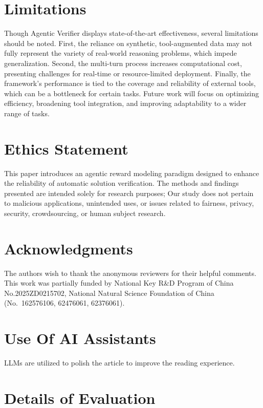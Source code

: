 \documentclass[11pt]{article}
\begin{document}
\section{Limitations}
Though Agentic Verifier displays state-of-the-art effectiveness, several limitations should be noted. First, the reliance on synthetic, tool-augmented data may not fully represent the variety of real-world reasoning problems, which impede generalization. Second, the multi-turn process increases computational cost, presenting challenges for real-time or resource-limited deployment. Finally, the framework’s performance is tied to the coverage and reliability of external tools, which can be a bottleneck for certain tasks. 
Future work will focus on optimizing efficiency, broadening tool integration, and improving adaptability to a wider range of tasks.

\section{Ethics Statement}
This paper introduces an agentic reward modeling paradigm designed to enhance the reliability of automatic solution verification. 
The methods and findings presented are intended solely for research purposes; Our study does not pertain to malicious applications, unintended uses, or issues related to fairness, privacy, security, crowdsourcing, or human subject research.

\section*{Acknowledgments}
The authors wish to thank the anonymous reviewers for their helpful comments. This work was partially funded by National Key R\&D Program of China No.2025ZD0215702, National Natural Science Foundation of China (No.~162576106, 62476061, 62376061).



\appendix

  

\section{Use Of AI Assistants}
LLMs are utilized to polish the article to improve the reading experience. 

\section{Details of Evaluation}
\label{sec:appendix_prompts}
\end{document}
